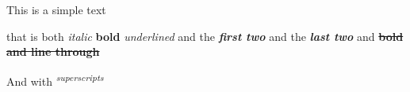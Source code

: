 This is a simple text

that is both \emph{italic }\textbf{bold }\emph{underlined }and the
\emph{\textbf{first two}} and the \emph{\textbf{last two }} and
\textbf{\sout{bold and line through}}

And with \textsuperscript{\emph{superscripts}}
